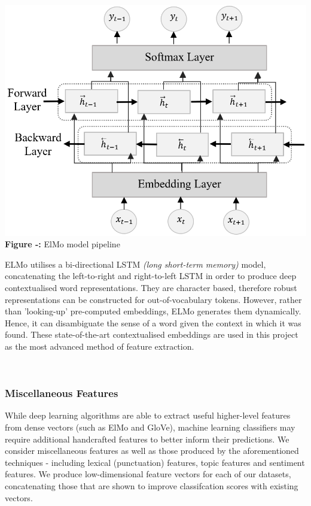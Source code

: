 \documentclass[12pt,a4paper]{article}
\begin{document}
\begin{minipage}{0.3\textwidth}
	 	\begin{center}
		\hspace{-1.5cm}\includegraphics[width=1.2\textwidth]{Images/elmo_diagram2.png}\\
		\hspace{-1cm}\textbf{Figure -:} ElMo model pipeline\\
		\label{ElMo Model}
	\end{center}
\end{minipage} \hfill
\begin{minipage}{0.66\textwidth}
	  ELMo utilises a bi-directional LSTM \textit{(long short-term memory)} model, concatenating the left-to-right and right-to-left LSTM in order to produce deep contextualised word representations. They are character based, therefore robust representations can be constructed for out-of-vocabulary tokens. However, rather than 'looking-up' pre-computed embeddings, ELMo generates them dynamically. Hence, it can disambiguate the sense of a word given the context in which it was found. These state-of-the-art contextualised embeddings are used in this project as the most advanced method of feature extraction.
\end{minipage}\\

\subsubsection{Miscellaneous Features}
While deep learning algorithms are able to extract useful higher-level features from dense vectors (such as ElMo and GloVe), machine learning classifiers may require additional handcrafted features to better inform their predictions. We consider miscellaneous features as well as those produced by the aforementioned techniques - including lexical (punctuation) features, topic features and sentiment features. We produce low-dimensional feature vectors for each of our datasets, concatenating those that are shown to improve classifcation scores with existing vectors.\\\vspace{-5pt}
\end{document}
